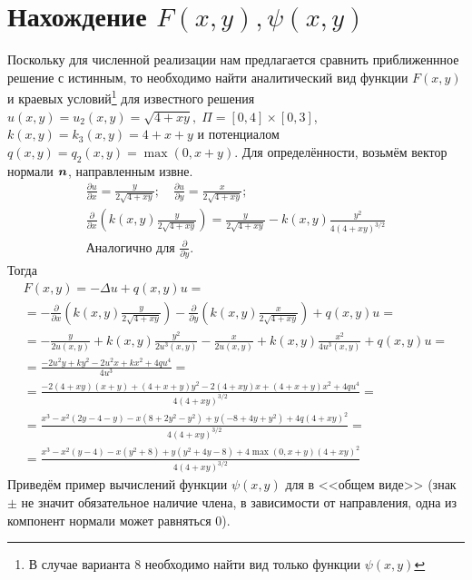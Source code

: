 \documentclass[12pt, fleqn]{article}
\theoremstyle{definition}
\def\vec#1{\mathchoice{\mbox{\boldmath$\displaystyle#1$}}
{\mbox{\boldmath$\textstyle#1$}} {\mbox{\boldmath$\scriptstyle#1$}} {\mbox{\boldmath$\scriptscriptstyle#1$}}}
\begin{document}
\section{Нахождение $F(x, y), \psi(x, y)$}
Поскольку для численной реализации нам предлагается сравнить приближеннное решение с истинным, то необходимо найти аналитический вид функции $F(x, y)$ и краевых условий\footnote{В случае варианта 8 необходимо найти вид только функции $\psi(x, y)$} для известного решения $u(x,y) = u_2(x, y) = \sqrt{4 + xy}, \;\Pi = [0,4]\times[0, 3]$, $k(x, y) = k_3(x, y) = 4 + x + y$ и потенциалом $q(x, y) = q_2(x, y) = \max(0, x + y)$. Для определённости, возьмём вектор нормали $\vec{n}$, направленным извне.
\abovedisplayskip=1pt
\belowdisplayskip=2pt
\noindent
\begin{gather*}
 \frac{\partial u}{\partial x} = \frac{y}{2\sqrt{4 + xy}}; \quad \frac{\partial u}{\partial y} = \frac{x}{2\sqrt{4 + xy}}; \\
 \frac{\partial}{\partial x}\left(k(x, y)\frac{y}{2\sqrt{4 + xy}}\right) = \frac{y}{2\sqrt{4 + xy}} - k(x, y)\frac{y^2}{4(4 + xy)^{3/2}}\\
 \text{Аналогично для }\frac{\partial}{\partial y}.
\end{gather*}
Тогда
\abovedisplayskip=1pt
\belowdisplayskip=2pt
\noindent
\begin{gather}
 F(x, y) = -\Delta u+q(x, y) u = \nonumber \\
 = -\frac{\partial}{\partial x}\left(k(x, y)\frac{y}{2\sqrt{4 + xy}}\right) - \frac{\partial}{\partial y}\left(k(x, y)\frac{x}{2\sqrt{4 + xy}}\right) + q(x, y)u = \nonumber \\
 = -\frac{y}{2u(x, y)} + k(x, y)\frac{y^2}{2u^3(x, y)} - \frac{x}{2u(x, y)} + k(x, y)\frac{x^2}{4u^3(x, y)}  + q(x, y)u = \nonumber \\
 = \frac{-2u^2 y + ky^2 - 2u^2x + kx^2 + 4qu^4}{4u^3} = \nonumber \\
 = \frac{-2(4 + xy)(x+y) + (4 + x + y)y^2 - 2(4 + xy)x + (4 + x + y)x^2 + 4qu^4}{4(4 + xy)^{3/2}} = \nonumber \\
 = \frac{x^3 - x^2(2y - 4 - y) -x(8 + 2y^2 - y^2) + y(-8 + 4y + y^2) + 4q(4 + xy)^2}{4(4 + xy)^{3/2}} = \nonumber \\
 = \frac{x^3 - x^2(y - 4) - x(y^2 + 8) + y(y^2 + 4y -8) + 4\max(0, x+y)(4 + xy)^2}{4(4 + xy)^{3/2}} \label{eq:F}
\end{gather}
Приведём пример вычислений функции $\psi(x, y)$ для в <<общем виде>> (знак $\pm$ не значит обязательное наличие члена, в зависимости от направления, одна из компонент нормали может равняться 0).
\end{document}
